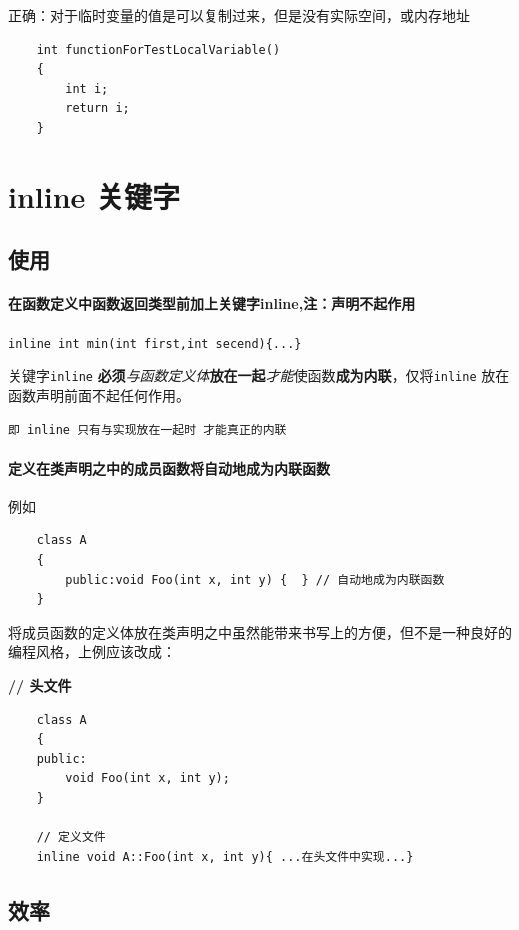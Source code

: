 \documentclass[UTF8,a4paper,12pt]{ctexbook} %
\begin{document}
	 		
	 		正确：对于临时变量的值是可以复制过来，但是没有实际空间，或内存地址
		 	\begin{lstlisting}
	int functionForTestLocalVariable()
	{
		int i;
		return i;
	}	 		
		 	\end{lstlisting}
 		
\chapter{inline 关键字} 
 
     \section{使用}
	       \subsubsection{在函数定义中函数返回类型前加上关键字inline,注：声明不起作用} \verb|inline int min(int first,int secend){...}|
       
       关键字\verb|inline| \textbf{必须}\textit{与函数定义体}\textbf{放在一起}\textit{才能}使函数\textbf{成为内联}，仅将\verb|inline| 放在函数声明前面不起任何作用。
       
	   \verb|即 inline 只有与实现放在一起时 才能真正的内联|
	       \subsubsection{定义在类声明之中的成员函数将自动地成为内联函数} 
       
		       例如
		       \begin{lstlisting}
	class A
	{
		public:void Foo(int x, int y) {  } // 自动地成为内联函数
	}
		       \end{lstlisting}
		       
		       将成员函数的定义体放在类声明之中虽然能带来书写上的方便，但不是一种良好的编程风格，上例应该改成：
		       
		       \textbf{// 头文件}
		       
		        \begin{lstlisting}
	class A
	{
	public:
		void Foo(int x, int y);
	}		        
	
	// 定义文件
	inline void A::Foo(int x, int y){ ...在头文件中实现...} 
		        \end{lstlisting}
		       
    \section{效率}
\end{document}
